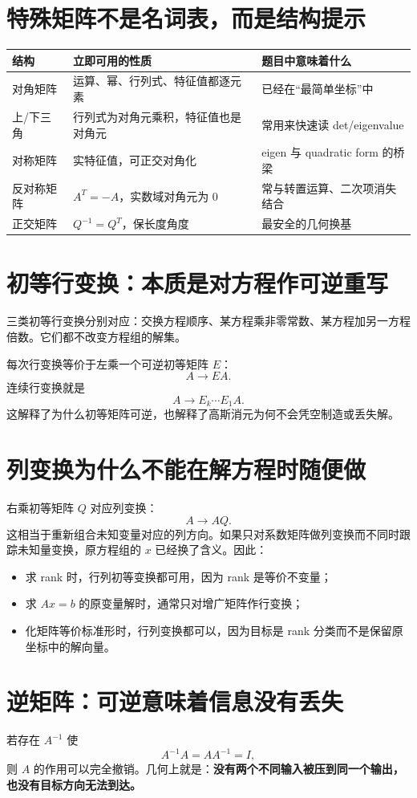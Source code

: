 \documentclass[11pt,a4paper,openany]{ctexbook}
\newcommand{\key}[1]{\textbf{\color{deep}#1}}
\begin{document}
\section{特殊矩阵不是名词表，而是结构提示}
\begin{longtable}{L{2.7cm}L{5.0cm}L{\dimexpr\linewidth-8.27cm\relax}}
\toprule
\textbf{结构} & \textbf{立即可用的性质} & \textbf{题目中意味着什么}\\
\midrule
对角矩阵 & 运算、幂、行列式、特征值都逐元素 & 已经在“最简单坐标”中\\
上/下三角 & 行列式为对角元乘积，特征值也是对角元 & 常用来快速读 det/eigenvalue\\
对称矩阵 & 实特征值，可正交对角化 & eigen 与 quadratic form 的桥梁\\
反对称矩阵 & $A^T=-A$，实数域对角元为 0 & 常与转置运算、二次项消失结合\\
正交矩阵 & $Q^{-1}=Q^T$，保长度角度 & 最安全的几何换基\\
\bottomrule
\end{longtable}

\section{初等行变换：本质是对方程作可逆重写}
三类初等行变换分别对应：交换方程顺序、某方程乘非零常数、某方程加另一方程倍数。它们都不改变方程组的解集。

每次行变换等价于左乘一个可逆初等矩阵 $E$：
\[
A\to EA.
\]
连续行变换就是
\[
A\to E_k\cdots E_1A.
\]
这解释了为什么初等矩阵可逆，也解释了高斯消元为何不会凭空制造或丢失解。

\section{列变换为什么不能在解方程时随便做}
右乘初等矩阵 $Q$ 对应列变换：
\[
A\to AQ.
\]
这相当于重新组合未知变量对应的列方向。如果只对系数矩阵做列变换而不同时跟踪未知量变换，原方程组的 $x$ 已经换了含义。因此：
\begin{itemize}
  \item 求 rank 时，行列初等变换都可用，因为 rank 是等价不变量；
  \item 求 $Ax=b$ 的原变量解时，通常只对增广矩阵作行变换；
  \item 化矩阵等价标准形时，行列变换都可以，因为目标是 rank 分类而不是保留原坐标中的解向量。
\end{itemize}

\section{逆矩阵：可逆意味着信息没有丢失}
若存在 $A^{-1}$ 使
\[
A^{-1}A=AA^{-1}=I,
\]
则 $A$ 的作用可以完全撤销。几何上就是：\key{没有两个不同输入被压到同一个输出，也没有目标方向无法到达。}
\end{document}
